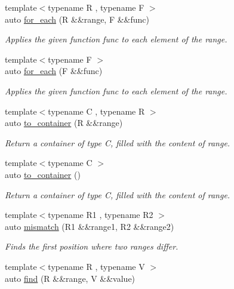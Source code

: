 \begin{DoxyCompactItemize}
{\footnotesize template$<$typename R , typename F $>$ }\\auto \mbox{\hyperlink{namespacerah_afd971bc9f9c098df8422e221adfb199f}{for\+\_\+each}} (R \&\&range, F \&\&func)
\begin{DoxyCompactList}\small\item\em Applies the given function func to each element of the range. \end{DoxyCompactList}\item 
{\footnotesize template$<$typename F $>$ }\\auto \mbox{\hyperlink{namespacerah_a76e2ce1a497aa3726cc9d99fb320ac67}{for\+\_\+each}} (F \&\&func)
\begin{DoxyCompactList}\small\item\em Applies the given function func to each element of the range. \end{DoxyCompactList}\item 
{\footnotesize template$<$typename C , typename R $>$ }\\auto \mbox{\hyperlink{namespacerah_a11fcae12055a2bcf5ac7c41e25e74a32}{to\+\_\+container}} (R \&\&range)
\begin{DoxyCompactList}\small\item\em Return a container of type C, filled with the content of range. \end{DoxyCompactList}\item 
{\footnotesize template$<$typename C $>$ }\\auto \mbox{\hyperlink{namespacerah_aac33763a1f49060e179c2c2053ec07a2}{to\+\_\+container}} ()
\begin{DoxyCompactList}\small\item\em Return a container of type C, filled with the content of range. \end{DoxyCompactList}\item 
{\footnotesize template$<$typename R1 , typename R2 $>$ }\\auto \mbox{\hyperlink{namespacerah_a5ce2d92c6f0b3dd5eb6d70600e949a97}{mismatch}} (R1 \&\&range1, R2 \&\&range2)
\begin{DoxyCompactList}\small\item\em Finds the first position where two ranges differ. \end{DoxyCompactList}\item 
{\footnotesize template$<$typename R , typename V $>$ }\\auto \mbox{\hyperlink{namespacerah_a7c7d4f08068e85923f475a069c3daeb7}{find}} (R \&\&range, V \&\&value)

\end{DoxyCompactItemize}

